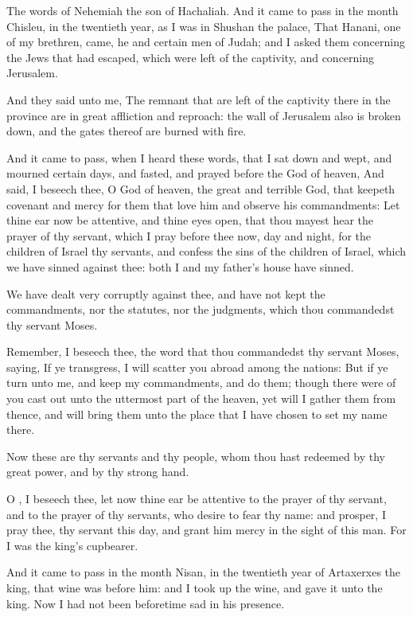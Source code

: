 \Chapter
\Verse The words of Nehemiah the son of Hachaliah. And it came to pass in the month Chisleu, in the twentieth year, as I was in Shushan the palace, \Verse That Hanani, one of my brethren, came, he and certain men of Judah; and I asked them concerning the Jews that had escaped, which were left of the captivity, and concerning Jerusalem.

\Verse And they said unto me, The remnant that are left of the captivity there in the province are in great affliction and reproach: the wall of Jerusalem also is broken down, and the gates thereof are burned with fire.

\Verse And it came to pass, when I heard these words, that I sat down and wept, and mourned certain days, and fasted, and prayed before the God of heaven, \Verse And said, I beseech thee, O \LORD God of heaven, the great and terrible God, that keepeth covenant and mercy for them that love him and observe his commandments: \Verse Let thine ear now be attentive, and thine eyes open, that thou mayest hear the prayer of thy servant, which I pray before thee now, day and night, for the children of Israel thy servants, and confess the sins of the children of Israel, which we have sinned against thee: both I and my father's house have sinned.

\Verse We have dealt very corruptly against thee, and have not kept the commandments, nor the statutes, nor the judgments, which thou commandedst thy servant Moses.

\Verse Remember, I beseech thee, the word that thou commandedst thy servant Moses, saying, If ye transgress, I will scatter you abroad among the nations: \Verse But if ye turn unto me, and keep my commandments, and do them; though there were of you cast out unto the uttermost part of the heaven, yet will I gather them from thence, and will bring them unto the place that I have chosen to set my name there.

\Verse Now these are thy servants and thy people, whom thou hast redeemed by thy great power, and by thy strong hand.

\Verse O \LORD, I beseech thee, let now thine ear be attentive to the prayer of thy servant, and to the prayer of thy servants, who desire to fear thy name: and prosper, I pray thee, thy servant this day, and grant him mercy in the sight of this man. For I was the king's cupbearer.


\Chapter
\Verse And it came to pass in the month Nisan, in the twentieth year of Artaxerxes the king, that wine was before him: and I took up the wine, and gave it unto the king. Now I had not been beforetime sad in his presence.

